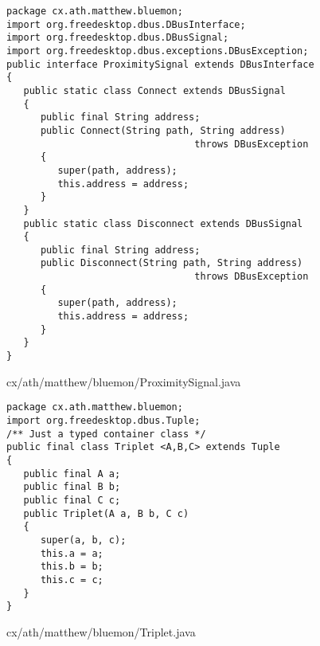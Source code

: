 \documentclass[a4paper,12pt]{article}
\begin{document}
\begin{figure}[!h]
\begin{center}
\begin{verbatim}
package cx.ath.matthew.bluemon;
import org.freedesktop.dbus.DBusInterface;
import org.freedesktop.dbus.DBusSignal;
import org.freedesktop.dbus.exceptions.DBusException;
public interface ProximitySignal extends DBusInterface
{
   public static class Connect extends DBusSignal
   {
      public final String address;
      public Connect(String path, String address) 
                                 throws DBusException
      {
         super(path, address);
         this.address = address;
      }
   }
   public static class Disconnect extends DBusSignal
   {
      public final String address;
      public Disconnect(String path, String address)
                                 throws DBusException
      {
         super(path, address);
         this.address = address;
      }
   }
}
\end{verbatim}
\end{center}
\caption{cx/ath/matthew/bluemon/ProximitySignal.java}
\end{figure}

\newpage

\begin{figure}[!h]
\begin{center}
\begin{verbatim}
package cx.ath.matthew.bluemon;
import org.freedesktop.dbus.Tuple;
/** Just a typed container class */
public final class Triplet <A,B,C> extends Tuple
{
   public final A a;
   public final B b;
   public final C c;
   public Triplet(A a, B b, C c)
   {
      super(a, b, c);
      this.a = a;
      this.b = b;
      this.c = c;
   }
}
\end{verbatim}
\end{center}
\caption{cx/ath/matthew/bluemon/Triplet.java}
\end{figure}

\newpage
\end{document}
